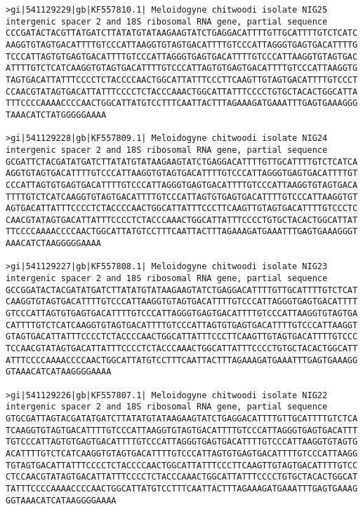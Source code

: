 \documentclass[11pt]{article}
\begin{document}
\begin{Verbatim}[commandchars=\\\{\}]
>gi|541129229|gb|KF557810.1| Meloidogyne chitwoodi isolate NIG25 intergenic spacer 2 and 18S ribosomal RNA gene, partial sequence
CCCGATACTACGTTATGATCTTATATGTATAAGAAGTATCTGAGGACATTTTGTTGCATTTTGTCTCATC
AAGGTGTAGTGACATTTTGTCCCATTAAGGTGTAGTGACATTTTGTCCCATTAGGGTGAGTGACATTTTG
TCCCATTAGTGTGAGTGACATTTTGTCCCATTAGGGTGAGTGACATTTTGTCCCATTAAGGTGTAGTGAC
ATTTTGTCTCATCAAGGTGTAGTGACATTTTGTCCCATTAGTGTGAGTGACATTTTGTCCCATTAAGGTG
TAGTGACATTATTTCCCCTCTACCCCAACTGGCATTATTTCCCTTCAAGTTGTAGTGACATTTTGTCCCT
CCAACGTATAGTGACATTATTTCCCCTCTACCCAAACTGGCATTATTTCCCCTGTGCTACACTGGCATTA
TTTCCCCAAAACCCCAACTGGCATTATGTCCTTTCAATTACTTTAGAAAGATGAAATTTGAGTGAAAGGG
TAAACATCTATGGGGGAAAA

>gi|541129228|gb|KF557809.1| Meloidogyne chitwoodi isolate NIG24 intergenic spacer 2 and 18S ribosomal RNA gene, partial sequence
GCGATTCTACGATATGATCTTATATGTATAAGAAGTATCTGAGGACATTTTGTTGCATTTTGTCTCATCA
AGGTGTAGTGACATTTTGTCCCATTAAGGTGTAGTGACATTTTGTCCCATTAGGGTGAGTGACATTTTGT
CCCATTAGTGTGAGTGACATTTTGTCCCATTAGGGTGAGTGACATTTTGTCCCATTAAGGTGTAGTGACA
TTTTGTCTCATCAAGGTGTAGTGACATTTTGTCCCATTAGTGTGAGTGACATTTTGTCCCATTAAGGTGT
AGTGACATTATTTCCCCTCTACCCCAACTGGCATTATTTCCCTTCAAGTTGTAGTGACATTTTGTCCCTC
CAACGTATAGTGACATTATTTCCCCTCTACCCAAACTGGCATTATTTCCCCTGTGCTACACTGGCATTAT
TTCCCCAAAACCCCAACTGGCATTATGTCCTTTCAATTACTTTAGAAAGATGAAATTTGAGTGAAAGGGT
AAACATCTAAGGGGGAAAA

>gi|541129227|gb|KF557808.1| Meloidogyne chitwoodi isolate NIG23 intergenic spacer 2 and 18S ribosomal RNA gene, partial sequence
GCCGGATACTACGATATGATCTTATATGTATAAGAAGTATCTGAGGACATTTTGTTGCATTTTGTCTCAT
CAAGGTGTAGTGACATTTTGTCCCATTAAGGTGTAGTGACATTTTGTCCCATTAGGGTGAGTGACATTTT
GTCCCATTAGTGTGAGTGACATTTTGTCCCATTAGGGTGAGTGACATTTTGTCCCATTAAGGTGTAGTGA
CATTTTGTCTCATCAAGGTGTAGTGACATTTTGTCCCATTAGTGTGAGTGACATTTTGTCCCATTAAGGT
GTAGTGACATTATTTCCCCTCTACCCCAACTGGCATTATTTCCCTTCAAGTTGTAGTGACATTTTGTCCC
TCCAACGTATAGTGACATTATTTCCCCTCTACCCAAACTGGCATTATTTCCCCTGTGCTACACTGGCATT
ATTTCCCCAAAACCCCAACTGGCATTATGTCCTTTCAATTACTTTAGAAAGATGAAATTTGAGTGAAAGG
GTAAACATCATAAGGGGAAAA

>gi|541129226|gb|KF557807.1| Meloidogyne chitwoodi isolate NIG22 intergenic spacer 2 and 18S ribosomal RNA gene, partial sequence
GTGCGATTAGTACGATATGATCTTATATGTATAAGAAGTATCTGAGGACATTTTGTTGCATTTTGTCTCA
TCAAGGTGTAGTGACATTTTGTCCCATTAAGGTGTAGTGACATTTTGTCCCATTAGGGTGAGTGACATTT
TGTCCCATTAGTGTGAGTGACATTTTGTCCCATTAGGGTGAGTGACATTTTGTCCCATTAAGGTGTAGTG
ACATTTTGTCTCATCAAGGTGTAGTGACATTTTGTCCCATTAGTGTGAGTGACATTTTGTCCCATTAAGG
TGTAGTGACATTATTTCCCCTCTACCCCAACTGGCATTATTTCCCTTCAAGTTGTAGTGACATTTTGTCC
CTCCAACGTATAGTGACATTATTTCCCCTCTACCCAAACTGGCATTATTTCCCCTGTGCTACACTGGCAT
TATTTCCCCAAAACCCCAACTGGCATTATGTCCTTTCAATTACTTTAGAAAGATGAAATTTGAGTGAAAG
GGTAAACATCATAAGGGGAAAA


\end{Verbatim}
\end{document}

